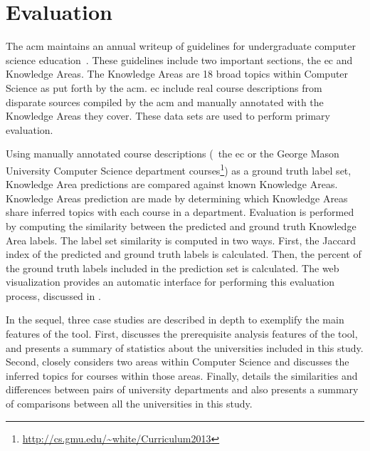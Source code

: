 \section{Evaluation}
\label{sec:evaluation}


The \ac{acm} maintains an annual writeup of guidelines for undergraduate computer science education~\cite{CS2013}.
These guidelines include two important sections, the \acf{ec} and Knowledge Areas.
The Knowledge Areas are 18 broad topics within Computer Science as put forth by the \ac{acm}.
\ac{ec} include real course descriptions from disparate sources compiled by the \ac{acm} and manually annotated with the Knowledge Areas they cover.
These data sets are used to perform primary evaluation.


Using manually annotated course descriptions (\eg\ the \ac{ec} or the George Mason University Computer Science department courses\footnote{\url{http://cs.gmu.edu/~white/Curriculum2013}}) as a ground truth label set, Knowledge Area predictions are compared against known Knowledge Areas.
Knowledge Areas prediction are made by determining which Knowledge Areas share inferred topics with each course in a department.
Evaluation is performed by computing the similarity between the predicted and ground truth Knowledge Area labels.
The label set similarity is computed in two ways.
First, the Jaccard index of the predicted and ground truth labels is calculated.
Then, the percent of the ground truth labels included in the prediction set is calculated.
The web visualization provides an automatic interface for performing this evaluation process, discussed in .


In the sequel, three case studies are described in depth to exemplify the main features of the tool.
First,  discusses the prerequisite analysis features of the tool, and presents a summary of statistics about the universities included in this study.
Second,  closely considers two areas within Computer Science and discusses the inferred topics for courses within those areas.
Finally,  details the similarities and differences between pairs of university departments and also presents a summary of comparisons between all the universities in this study.

